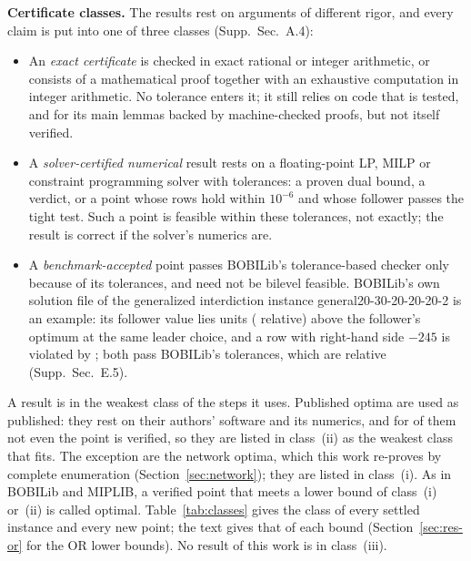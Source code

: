 \documentclass[]{spie}  %
\theoremstyle{plain}
\newcommand{\supp}[1]{Supp.\ Sec.~#1}
\newcommand{\inst}[1]{\mbox{#1}}             %
\newcommand{\cls}[1]{class~(#1)}             %
\begin{document}
\textbf{Certificate classes.} The results rest on arguments of different rigor, and every claim
is put into one of three classes (\supp{A.4}):
\begin{itemize}
\item[(i)] An \emph{exact certificate} is checked in exact rational or integer arithmetic, or
consists of a mathematical proof together with an exhaustive computation in integer arithmetic.
No tolerance enters it; it still relies on code that is tested, and for its main lemmas backed by
machine-checked proofs, but not itself verified.
\item[(ii)] A \emph{solver-certified numerical} result rests on a floating-point LP, MILP or
constraint programming solver with tolerances: a proven dual bound, a verdict, or a point whose
rows hold within $10^{-6}$ and whose follower passes the tight test. Such a point is feasible within
these tolerances, not exactly; the result is correct if the solver's numerics are.
\item[(iii)] A \emph{benchmark-accepted} point passes BOBILib's tolerance-based checker only
because of its tolerances, and need not be bilevel feasible. BOBILib's own solution file of the
generalized interdiction instance \inst{general20-30-20-20-20-2} is an example: its follower
value \GenTolPhiSol{} lies \GenTolDiff{} units (\GenTolRel{} relative) above the follower's
optimum \GenTolPhiOpt{} at the same leader choice, and a row with right-hand side $-245$ is
violated by \GenTolViolation{}; both pass BOBILib's tolerances, which are relative (\supp{E.5}).
\end{itemize}
A result is in the weakest class of the steps it uses. Published optima are used as published:
they rest on their authors' software and its numerics, and for \NumLitNoFile{} of them not even
the point is verified, so they are listed in \cls{ii} as the weakest class that fits. The
exception are the \NumClassExactLit{} network optima, which this work re-proves by complete
enumeration (Section~\ref{sec:network}); they are listed in \cls{i}. As in BOBILib and MIPLIB,
a verified point that meets a lower bound of \cls{i} or~(ii) is called optimal.
Table~\ref{tab:classes} gives the class of every settled instance and every new point; the text
gives that of each bound (Section~\ref{sec:res-or} for the OR lower bounds). No result of this work
is in \cls{iii}.
\end{document}
